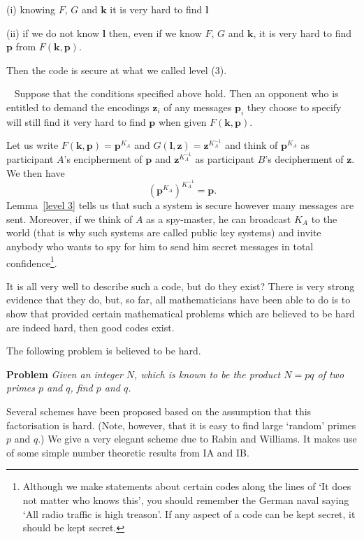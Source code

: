 (i) knowing $F$, $G$ and $\mathbf k$ 
it is very hard to find ${\mathbf l}$

(ii) if we do not know ${\mathbf l}$ then, even if we know $F$, $G$
and ${\mathbf k}$, it is very hard to find ${\mathbf p}$
from $F({\mathbf k},{\mathbf p})$.

\noindent
Then the code is secure at what we called level (3).
\begin{lemma}~\label{level 3}
Suppose that the conditions specified
above hold. Then an opponent who is entitled to
demand the encodings ${\mathbf z}_{i}$ of
any messages ${\mathbf p}_{i}$ they choose
to specify will still find it very hard to find
$\mathbf{p}$ when given
$F({\mathbf k},{\mathbf p})$.
\end{lemma}

Let us write $F({\mathbf k},{\mathbf p})={\mathbf p}^{K_{A}}$
and $G({\mathbf l},{\mathbf z})={\mathbf z}^{K_{A}^{-1}}$
and think of ${\mathbf p}^{K_{A}}$ as participant
$A$'s encipherment of $\mathbf{p}$ and
${\mathbf z}^{K_{A}^{-1}}$ as participant $B$'s
decipherment of ${\mathbf z}$. We then have
\[({\mathbf p}^{K_{A}})^{K_{A}^{-1}}={\mathbf p}.\]
Lemma~\ref{level 3} tells us that such a system
is secure however many messages are sent.
Moreover, if we think of $A$ as a spy-master,
he can broadcast $K_{A}$ to the world (that
is why such systems are called public key
systems) and invite anybody who
wants to spy for him to send him secret messages
in total confidence\footnote{Although we
make statements about certain codes along the lines
of `It does not matter who knows this', you
should remember the German naval saying
`All radio traffic is high treason'. If 
any aspect of a code can be
kept secret, it should be kept secret.}.

It is all very well to describe such a code,
but do they exist? There is very strong evidence
that they do, but, so far, all mathematicians
have been able to do is to show that
provided certain mathematical problems which
are believed to be hard are indeed hard,
then good codes exist.

The following problem is believed to be hard.

\noindent
{\bf Problem} \emph{Given an integer $N$, which is
known to be the product $N=pq$ of two primes
$p$ and $q$, find $p$ and $q$.}

\noindent
Several schemes have been proposed based on the
assumption that this factorisation is hard.
(Note, however, that it is easy to find large `random'
primes $p$ and $q$.) We give a very elegant
scheme due to Rabin and Williams. It makes use
of some simple number theoretic
results from IA and IB.

